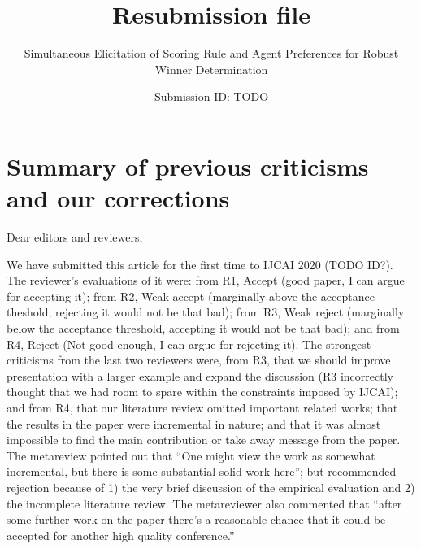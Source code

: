 \documentclass[version=3.21, pagesize, twoside=off, bibliography=totoc, DIV=calc, fontsize=12pt, a4paper]{scrartcl}
\title{Resubmission file}
\subtitle{Simultaneous Elicitation of Scoring Rule and Agent Preferences for Robust Winner Determination}
\author{Submission ID: TODO}
\date{}
\begin{document}
\maketitle

\section{Summary of previous criticisms and our corrections}

Dear editors and reviewers,

We have submitted this article for the first time to IJCAI 2020 (TODO ID?). The reviewer’s evaluations of it were: from R1, Accept (good paper, I can argue for accepting it); from R2, Weak accept (marginally above the acceptance theshold, rejecting it would not be that bad); from R3, Weak reject (marginally below the acceptance threshold, accepting it would not be that bad); and from R4, Reject (Not good enough, I can argue for rejecting it). The strongest criticisms from the last two reviewers were, from R3, that we should improve presentation with a larger example and expand the discussion (R3 incorrectly thought that we had room to spare within the constraints imposed by IJCAI); and from R4, that our literature review omitted important related works; that the results in the paper were incremental in nature; and that it was almost impossible to find the main contribution or take away message from the paper. The metareview pointed out that “One might view the work as somewhat incremental, but there is some substantial solid work here”; but recommended rejection because of 1) the very brief discussion of the empirical evaluation and 2) the incomplete literature review. The metareviewer also commented that “after some further work on the paper there's a reasonable chance that it could be accepted for another high quality conference.”
\end{document}
